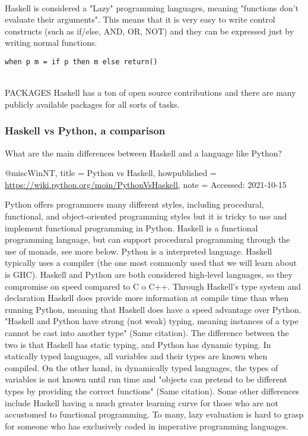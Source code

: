 \documentclass{article}
\begin{document}
\\
Haskell is considered a "Lazy" programming languages, meaning "functions don't evaluate their arguments". This means that it is very easy to write control constructs (such as if/else, AND, OR, NOT) and they can be expressed just by writing normal functions.
\\
\begin{lstlisting}
when p m = if p then m else return()
\end{lstlisting}
\\
PACKAGES
Haskell has a ton of open source contributions and there are many publicly available packages for all sorts of tasks.

\subsubsection{Haskell vs Python, a comparison}
What are the main differences between Haskell and a language like Python?

@misc{WinNT,
  title = {Python vs Haskell},
  howpublished = {\url{https://wiki.python.org/moin/PythonVsHaskell}},
  note = {Accessed: 2021-10-15}
}

Python offers programmers many different styles, including procedural, functional, and object-oriented programming styles \cite{WinNT} but it is tricky to use and implement functional programming in Python. Haskell is  a functional programming language, but can support procedural programming through the use of monads, see more below.
Python is a interpreted language. Haskell typically uses a compiler (the one most commonly used that we will learn about is GHC). Haskell and Python are both considered high-level languages, so they compromise on speed compared to C o C++. Through Haskell's type system and declaration Haskell does provide more information at compile time than when running Python, meaning that Haskell does have a speed advantage over Python. "Haskell and Python have strong (not weak) typing, meaning instances of a type cannot be cast into another type" (Same citation). The difference between the two is that Haskell has static typing, and Python has dynamic typing. In statically typed languages, all variables and their types are known when compiled. On the other hand, in dynamically typed languages, the types of variables is not known until run time and "objects can pretend to be different types by providing the correct functions" (Same citation). Some other differences include Haskell having a much greater learning curve for those who are not accustomed to functional programming. To many, lazy evaluation is hard to grasp for someone who has exclusively coded in imperative programming languages.
\end{document}
